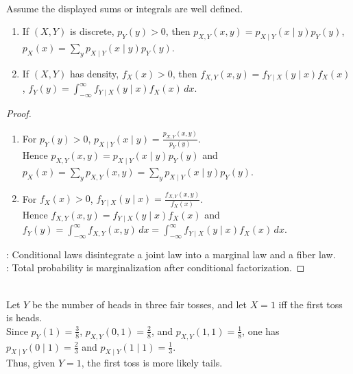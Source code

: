 \begin{proposition} \label{prop:conditional-law-factorizations-total-probability} \\
Assume the displayed sums or integrals are well defined.
\begin{enumerate}[label=(\roman*)]
\setlength{\itemsep}{0pt}
\item If $(X,Y)$ is discrete, $p_Y(y)>0$, then $p_{X,Y}(x,y)=p_{X\mid Y}(x\mid y)p_Y(y)$, $p_X(x)=\sum\limits_y p_{X\mid Y}(x\mid y)p_Y(y)$.
\item If $(X,Y)$ has density, $f_X(x)>0$, then $f_{X,Y}(x,y)=f_{Y\mid X}(y\mid x)f_X(x)$, $f_Y(y)=\int_{-\infty}^{\infty}f_{Y\mid X}(y\mid x)f_X(x)\,dx$.
\end{enumerate}
\begin{proof}
\begin{enumerate}[label=(\roman*)]
\setlength{\itemsep}{0pt}
\item For $p_Y(y)>0$, $p_{X\mid Y}(x\mid y)=\frac{p_{X,Y}(x,y)}{p_Y(y)}$.\\
Hence $p_{X,Y}(x,y)=p_{X\mid Y}(x\mid y)p_Y(y)$ and $p_X(x)=\sum\limits_y p_{X,Y}(x,y)=\sum\limits_y p_{X\mid Y}(x\mid y)p_Y(y)$.
\item For $f_X(x)>0$, $f_{Y\mid X}(y\mid x)=\frac{f_{X,Y}(x,y)}{f_X(x)}$.\\
Hence $f_{X,Y}(x,y)=f_{Y\mid X}(y\mid x)f_X(x)$ and $f_Y(y)=\int_{-\infty}^{\infty}f_{X,Y}(x,y)\,dx=\int_{-\infty}^{\infty}f_{Y\mid X}(y\mid x)f_X(x)\,dx$.
\end{enumerate}
: Conditional laws disintegrate a joint law into a marginal law and a fiber law.\\
: Total probability is marginalization after conditional factorization.
\end{proof}
\end{proposition}

\begin{example} \label{ex:three-toss-conditional-mass} \\
Let $Y$ be the number of heads in three fair tosses, and let $X=1$ iff the first toss is heads.\\
Since $p_Y(1)=\frac{3}{8}$, $p_{X,Y}(0,1)=\frac{2}{8}$, and $p_{X,Y}(1,1)=\frac{1}{8}$, one has $p_{X\mid Y}(0\mid1)=\frac{2}{3}$ and $p_{X\mid Y}(1\mid1)=\frac{1}{3}$.\\
Thus, given $Y=1$, the first toss is more likely tails.
\end{example}

